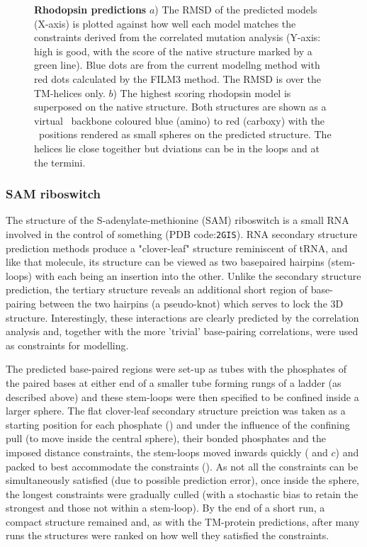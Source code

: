 \begin{figure}
\centering
{}
\caption{
\label{Fig:rhod-pred}
{\bf Rhodopsin predictions}
$a$) The RMSD of the predicted models (X-axis) is plotted against how well each model matches
the constraints derived from the correlated mutation analysis (Y-axis: high is good, with
the score of the native structure marked by a green line).
Blue dots are from the current modellng method with red dots calculated by the FILM3
method.  The RMSD is over the TM-helices only.
$b$) The highest scoring rhodopsin model is superposed on the native structure.
Both structures are shown as a virtual \CA\ backbone coloured blue (amino) to red (carboxy)
with the \CA\ positions rendered as small spheres on the predicted structure.
The helices lie close togeither but dviations can be in the loops and at the termini.
}
\end{figure}


\subsubsection{SAM riboswitch}

The structure of the S-adenylate-methionine (SAM) riboswitch is a small RNA involved
in the control of something (PDB code:{\tt 2GIS}).   RNA secondary structure prediction methods produce
a "clover-leaf" structure reminiscent of tRNA, and like that molecule, its structure
can be viewed as two basepaired hairpins (stem-loops) with each being an insertion into the other.
Unlike the secondary structure prediction, the tertiary structure reveals an additional
short region of base-pairing between the two hairpins (a pseudo-knot) which serves
to lock the 3D structure.   Interestingly, these interactions are clearly predicted
by the correlation analysis and, together with the more 'trivial' base-pairing
correlations, were used as constraints for modelling.

The predicted base-paired regions were set-up as tubes with the phosphates of the paired bases
at either end of a smaller tube forming rungs of a ladder (as described above) and these stem-loops
were then specified to be confined inside a larger sphere.    The flat clover-leaf secondary structure
preiction was taken as a starting position for each phosphate () and under the
influence of the confining pull (to move inside the central sphere), their bonded phosphates
and the imposed distance constraints, the stem-loops moved inwards quickly ( and $c$)
and packed to best accommodate the constraints ().    As not all the constraints can be
simultaneously satisfied (due to possible prediction error), once inside the sphere,
the longest constraints were gradually culled (with a stochastic bias to retain the
strongest and those not within a stem-loop).   By the end of a short run, a compact
structure remained and, as with the TM-protein predictions, after many runs the structures
were ranked on how well they satisfied the constraints.

